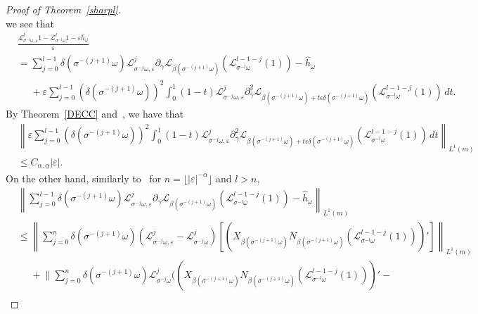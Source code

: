 \documentclass[12pt,reqno,a4paper]{article}
\begin{document}
\begin{proof}[Proof of Theorem~\ref{sharpl}]
\[	\]
	we see that 
	\[
	\begin{split}
		&\frac{\mathcal L_{\sigma^{-l}\omega, \varepsilon}^l1-\mathcal L_{\sigma^{-l}\omega}^l 1-\varepsilon \hat h_\omega}{\varepsilon}\\
		&=\sum_{j=0}^{l-1}\delta (\sigma^{-(j+1)}\omega)\mathcal L_{\sigma^{-j}\omega, \varepsilon}^{j}\partial_\gamma \mathcal L_{\beta(\sigma^{-(j+1)}\omega)}(\mathcal L_{\sigma^{-l}\omega}^{l-1-j}(1))-\hat h_\omega \\
		&\phantom{=}+\varepsilon \sum_{j=0}^{l-1}(\delta(\sigma^{-(j+1)}\omega))^2 \int_0^1 (1-t)\mathcal L_{\sigma^{-j}\omega, \varepsilon}^j \partial_\gamma^2 \mathcal L_{\beta(\sigma^{-(j+1)}\omega)+t\epsilon \delta(\sigma^{-(j+1)}\omega)}(\mathcal L_{\sigma^{-l}\omega}^{l-1-j}(1))\, dt.
	\end{split}
	\]
	By Theorem~\ref{DECC} and~\cite[Lemma 16]{DGTS}, we have that 
	\begin{equation}\label{ap2}
		\begin{split}
			&\left \|\varepsilon \sum_{j=0}^{l-1}(\delta(\sigma^{-(j+1)}\omega))^2 \int_0^1 (1-t)\mathcal L_{\sigma^{-j}\omega, \varepsilon}^j \partial_\gamma^2 \mathcal L_{\beta(\sigma^{-(j+1)}\omega)+t\epsilon \delta(\sigma^{-(j+1)}\omega)}(\mathcal L_{\sigma^{-l}\omega}^{l-1-j}(1))\, dt\right \|_{L^1(m)}  \\
			&\le C_{\alpha, \underline{\alpha}}|\varepsilon|.
		\end{split}
	\end{equation}
	On the other hand, similarly to~\cite[Remark 21]{DGTS} for $n=\lfloor |\varepsilon|^{-\alpha}\rfloor$ and $l>n$,
	\begin{equation}\label{ap3}
		\begin{split}
			&\left \|\sum_{j=0}^{l-1}\delta (\sigma^{-(j+1)}\omega)\mathcal L_{\sigma^{-j}\omega, \varepsilon}^{j}\partial_\gamma \mathcal L_{\beta(\sigma^{-(j+1)}\omega)}(\mathcal L_{\sigma^{-l}\omega}^{l-1-j}(1))-\hat h_\omega\right \|_{L^1(m)} \\
			&\le \left \| \sum_{j=0}^n \delta  (\sigma^{-(j+1)}\omega) (\mathcal L_{\sigma^{-j}\omega, \varepsilon}^j-\mathcal L_{\sigma^{-j}\omega}^j)[(X_{\beta(\sigma^{-(j+1)}\omega)} N_{\beta(\sigma^{-(j+1)}\omega)}(\mathcal L_{\sigma^{-l}\omega}^{l-1-j}(1)))'] \right \|_{L^1(m)}\\
			&\phantom{\le }+
			\bigg \|\sum_{j=0}^n \delta (\sigma^{-(j+1)}\omega)\mathcal L_{\sigma^{-j}\omega}^j ((X_{\beta(\sigma^{-(j+1)}\omega)} N_{\beta(\sigma^{-(j+1)}\omega)}(\mathcal L_{\sigma^{-l}\omega}^{l-1-j}(1)))'- \\

\end{split}
\end{equation}
\end{proof}
\end{document}
